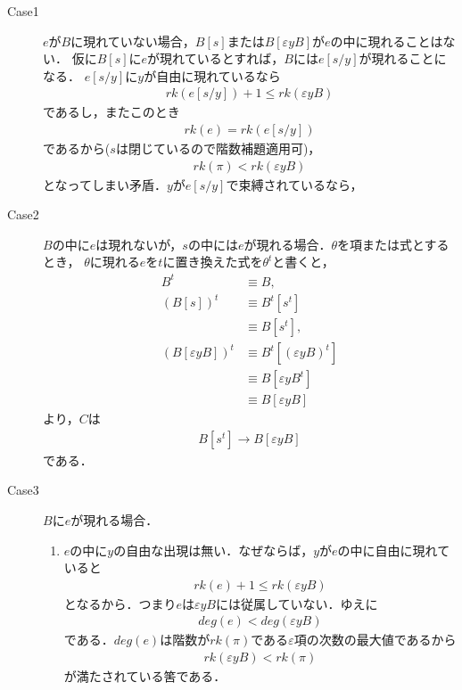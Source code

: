	\begin{sketch}\mbox{}
		\begin{description}
			\item[Case1]
				$e$が$B$に現れていない場合，$B[s]$または$B[\varepsilon y B]$が$e$の中に現れることはない．
				仮に$B[s]$に$e$が現れているとすれば，$B$には$e[s/y]$が現れることになる．
				$e[s/y]$に$y$が自由に現れているなら
				\begin{align}
					rk(e[s/y]) + 1 \leq rk(\varepsilon y B)
				\end{align}
				であるし，またこのとき
				\begin{align}
					rk(e) = rk(e[s/y])
				\end{align}
				であるから($s$は閉じているので階数補題適用可)，
				\begin{align}
					rk(\pi) < rk(\varepsilon y B)
				\end{align}
				となってしまい矛盾．$y$が$e[s/y]$で束縛されているなら，
				
				
			\item[Case2]
				$B$の中に$e$は現れないが，$s$の中には$e$が現れる場合．$\theta$を項または式とするとき，
				$\theta$に現れる$e$を$t$に置き換えた式を$\theta^{t}$と書くと，
				\begin{align}
					B^{t} &\equiv B, \\
					(B[s])^{t} &\equiv B^{t}[s^{t}] \\
					&\equiv B[s^{t}], \\
					(B[\varepsilon y B])^{t} &\equiv B^{t}[(\varepsilon y B)^{t}] \\
					&\equiv B[\varepsilon y B^{t}] \\
					&\equiv B[\varepsilon y B]
				\end{align}
				より，$C$は
				\begin{align}
					B[s^{t}] \rightarrow B[\varepsilon y B]
				\end{align}
				である．
				
			\item[Case3]
				$B$に$e$が現れる場合．
				\begin{enumerate}
					\item $e$の中に$y$の自由な出現は無い．なぜならば，$y$が$e$の中に自由に現れていると
						\begin{align}
							rk(e) + 1 \leq rk(\varepsilon y B)
						\end{align}
						となるから．つまり$e$は$\varepsilon y B$には従属していない．ゆえに
						\begin{align}
							deg(e) < deg(\varepsilon y B)
						\end{align}
						である．$deg(e)$は階数が$rk(\pi)$である$\varepsilon$項の次数の最大値であるから
						\begin{align}
							rk(\varepsilon y B) < rk(\pi)
						\end{align}
						が満たされている筈である．
					

\end{enumerate}
\end{description}
\end{sketch}
